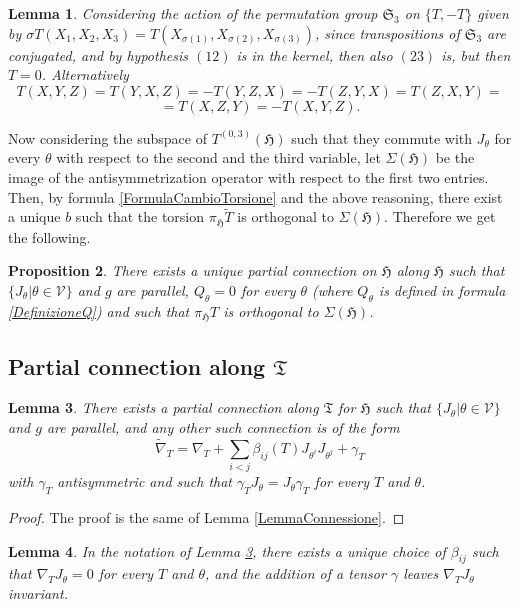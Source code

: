 \documentclass{article}
\newcommand{\ci}[1]{\mathscr{#1}}%
\newcommand{\g}[1]{\mathfrak{#1}}
\newtheorem{proposizione}{Proposition}[section]
\newtheorem{lemma}[proposizione]{Lemma}
\theoremstyle{definition}
\theoremstyle{remark}
\begin{document}
\begin{lemma}
 Considering the action of the permutation group $\g{S}_3$ on $\{T,-T\}$ given by $\sigma T(X_1,X_2,X_3)=T(X_{\sigma(1)},X_{\sigma(2)},X_{\sigma(3)})$, since transpositions of $\g{S}_3$ are conjugated, and by hypothesis $(12)$ is in the kernel, then also $(23)$ is, but then $T=0$.
 Alternatively
 $$T(X,Y,Z)=T(Y,X,Z)= -T(Y,Z,X) = -T(Z,Y,X) = T(Z,X,Y) =$$
 $$= T(X,Z,Y) = -T(X,Y,Z).$$
\end{lemma}

Now considering the subspace of $T^{(0,3)}(\g{H})$ such that they commute with $J_{\theta}$ for every $\theta$ with respect to the second and the third variable, let $\Sigma(\g{H})$ be the image of the antisymmetrization operator with respect to the first two entries.
Then, by formula \eqref{FormulaCambioTorsione} and the above reasoning, there exist a unique $b$ such that the torsion $\pi_{\g{H}}\widetilde{T}$ is orthogonal to $\Sigma(\g{H})$.
Therefore we get the following.

\begin{proposizione}\label{PropConnessioneH}
 There exists a unique partial connection on $\g{H}$ along $\g{H}$ such that $\{J_{\theta}|\theta\in\ci{V}\}$ and $g$ are parallel, $Q_{\theta}=0$ for every $\theta$ (where $Q_{\theta}$ is defined in formula \eqref{DefinizioneQ}) and such that $\pi_{\g{H}}T$ is orthogonal to $\Sigma(\g{H})$.
\end{proposizione}

\subsection{Partial connection along $\g{T}$}

\begin{lemma}\label{LemmaConnessioneReeb}
 There exists a partial connection along $\g{T}$ for $\g{H}$ such that $\{J_{\theta}|\theta\in\ci{V}\}$ and $g$ are parallel, and any other such connection is of the form
 $$\widetilde{\nabla}_T = \nabla_T + \sum_{i<j}\beta_{ij}(T)J_{\theta^i}J_{\theta^j} +\gamma_T$$
 with $\gamma_T$ antisymmetric and such that $\gamma_TJ_{\theta}=J_{\theta}\gamma_T$ for every $T$ and $\theta$.
\end{lemma}

\begin{proof}
 The proof is the same of Lemma \ref{LemmaConnessione}.
\end{proof}

\begin{lemma}\label{LemmaReeb2}
 In the notation of Lemma \ref{LemmaConnessioneReeb}, there exists a unique choice of $\beta_{ij}$ such that $\nabla_TJ_{\theta}=0$ for every $T$ and $\theta$, and the addition of a tensor $\gamma$ leaves $\nabla_TJ_{\theta}$ invariant.
\end{lemma}
\end{document}
